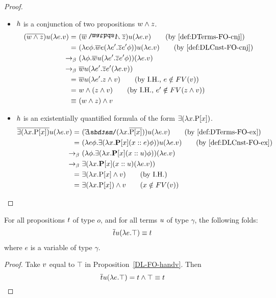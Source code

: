\begin{proof}
\begin{itemize}
\item $\h1$ is a conjunction of two propositions $\w1 \land \z1$.
\begin{align}
(\tr{\w1 \land \z1}) \u1 (\lambda e. \v1)  = \ & (\tr{\w1} \cnj2 \tr{\z1}) \u1 (\lambda e. \v1)   \tag{by~\eqref{def:DTerms-FO-cnj}} \\
 = \ & (\lambda e\phi. \tr{\w1} e (\lambda e'. \tr{\z1} e' \phi) ) \u1 (\lambda e. \v1)   \tag{by~\eqref{def:DLCnst-FO-cnj}} \\
\bconv \ & (\lambda \phi. \tr{\w1} \u1 (\lambda e'. \tr{\z1} e' \phi) ) (\lambda e. \v1)   \notag \\
\bconv \ &  \tr{\w1} \u1 (\lambda e'. \tr{\z1} e'  (\lambda e. \v1) )  \notag \\
= \ &  \tr{\w1} \u1 (\lambda e'. \z1 \land \v1)  \tag{by I.H., $e \notin FV(\v1)$} \\
= \ &  \w1 \land (\z1 \land \v1)  \tag{by I.H., $e' \notin FV(\z1 \land \v1)$} \\
\logeq \ & (\w1 \land \z1) \land \v1 \notag
\end{align}

\item $\h1$ is an existentially quantified formula of the form $\exists( \lambda \x1. \P1 [\x1])$.
\begin{align}
\tr{\exists ( \lambda \x1. \P1 [\x1])} \u1 (\lambda e. \v1)  = \ & ( \ex2 ( \lambda \x1. \tr{\P1 [\x1]})  ) \u1 (\lambda e. \v1)   \tag{by~\eqref{def:DTerms-FO-ex}} \\
 = \ & ( \lambda e \phi. \exists ( \lambda \x1. \P2 [\x1] (x::e) \phi  )) \u1 (\lambda e. \v1)   \tag{by~\eqref{def:DLCnst-FO-ex}} \\
\bconv \ & ( \lambda  \phi. \exists ( \lambda \x1. \P2 [\x1] (x::\u1) \phi  ))  (\lambda e. \v1)  \notag \\
\bconv \ & \exists ( \lambda \x1. \P2 [\x1] (x::\u1) (\lambda e. \v1)  )  \notag \\
= \ & \exists ( \lambda \x1. \P1 [\x1] \land \v1  )  \tag{by I.H.} \\
= \ & \exists ( \lambda \x1. \P1 [\x1]) \land \v1    \tag{$\x1 \notin FV(\v1)$} 
\end{align}

\end{itemize}
\end{proof}

\begin{corollary} \label{cor:DL-FO-handtop} For all propositions $\t1$ of type $o$, and for all terms $\u1$ of type $\gamma$, the following folds: 
\begin{align}\tr{\t1} \u1 (\lambda e. \top) \logeq  \t1 \notag  %
\end{align}
where $e$ is a variable of type $\gamma$.
 \label{DL-FO-handtop}
\end{corollary}
\begin{proof} Take $\v1$ equal to $\top$ in Proposition~\ref{DL-FO-handv}. Then
$$\tr{\t1} \u1 (\lambda e. \top) = \t1 \land \top \logeq \t1$$
\end{proof}


